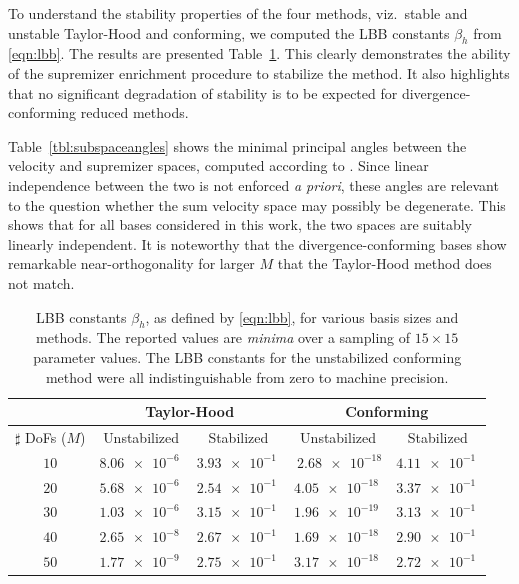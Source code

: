 \documentclass[onecolumn, twoside, a4paper, 11pt]{article}
\begin{document}
To understand the stability properties of the four methods, viz.~stable and unstable Taylor-Hood and
conforming, we computed the LBB constants $\beta_h$ from \eqref{eqn:lbb}. The results are presented
Table~\ref{tbl:lbb}. This clearly demonstrates the ability of the supremizer enrichment procedure to
stabilize the method. It also highlights that no significant degradation of stability is to be
expected for divergence-conforming reduced methods.

Table~\ref{tbl:subspaceangles} shows the minimal principal angles between the velocity and supremizer
spaces, computed according to \cite{Knyazev2002pab}. Since linear independence between the two is
not enforced \emph{a priori}, these angles are relevant to the question whether the sum velocity
space may possibly be degenerate. This shows that for all bases considered in this work, the two
spaces are suitably linearly independent. It is noteworthy that the divergence-conforming bases show
remarkable near-orthogonality for larger $M$ that the Taylor-Hood method does not match.

\begin{table}
  \begin{center}
    \bgroup{}
    \begin{tabular}{crrrr}
      & \multicolumn{2}{c}{\bf Taylor-Hood} & \multicolumn{2}{c}{\bf Conforming} \\
      \hline
      $\sharp$ DoFs ($M$)
      & \multicolumn{1}{c}{Unstabilized} & \multicolumn{1}{c}{Stabilized}
      & \multicolumn{1}{c}{Unstabilized} & \multicolumn{1}{c}{Stabilized} \\
      \hline $10$ & $\SI{8.06e-6}{}$ & $\SI{3.93e-1}{}$ & $\SI{2.68e-18}$ & $\SI{4.11e-1}{}$ \\
      $20$ & $\SI{5.68e-6}{}$ & $\SI{2.54e-1}{}$ & $\SI{4.05e-18}{}$ & $\SI{3.37e-1}{}$ \\
      $30$ & $\SI{1.03e-6}{}$ & $\SI{3.15e-1}{}$ & $\SI{1.96e-19}{}$ & $\SI{3.13e-1}{}$ \\
      $40$ & $\SI{2.65e-8}{}$ & $\SI{2.67e-1}{}$ & $\SI{1.69e-18}{}$ & $\SI{2.90e-1}{}$ \\
      $50$ & $\SI{1.77e-9}{}$ & $\SI{2.75e-1}{}$ & $\SI{3.17e-18}{}$ & $\SI{2.72e-1}{}$ \\
      \hline
    \end{tabular}
    \egroup
  \end{center}
  \caption{
    LBB constants $\beta_h$, as defined by \eqref{eqn:lbb}, for various basis
    sizes and methods. The reported values are \emph{minima} over a sampling of
    $15 \times 15$ parameter values. The LBB constants for the unstabilized conforming
    method were all indistinguishable from zero to machine precision.
  }
  \label{tbl:lbb}
\end{table}
\end{document}
